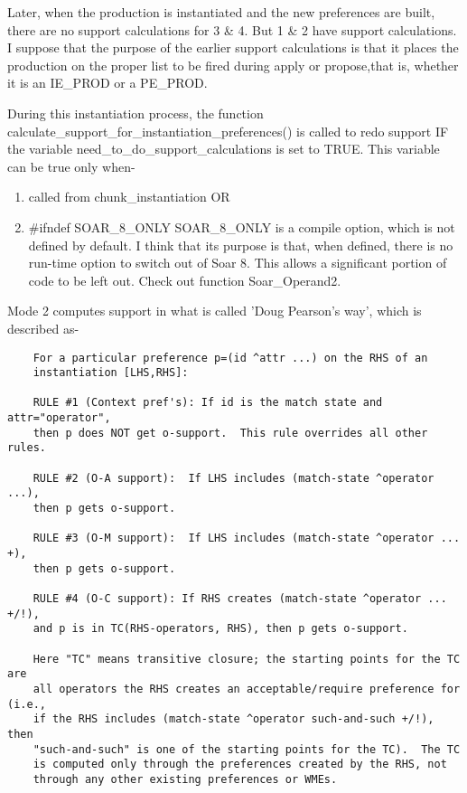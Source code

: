 {	Later, when the production is instantiated and the new preferences are built, there are no support calculations for 3 \& 4. But 1 \& 2 have support calculations. I suppose that the purpose of the earlier support calculations is that it places the production on the proper list to be fired during apply or propose,that is, whether it is an IE\_PROD or a PE\_PROD.

	During this instantiation process, the function calculate\_support\_for\_instantiation\_preferences() is called to redo support IF the variable need\_to\_do\_support\_calculations is set to TRUE. This variable can be true only when-

	\begin{enumerate}
		\item  called from chunk\_instantiation OR
		\item  \#ifndef SOAR\_8\_ONLY
		SOAR\_8\_ONLY is a compile option, which is not defined by default. I think that its purpose is that, when defined, there is no run-time option to switch out of Soar 8. This allows a significant portion of code to be left out. Check out function Soar\_Operand2.
	\end{enumerate}


	Mode 2 computes support in what is called 'Doug Pearson's way', which is described as-

	\begin{verbatim}
	For a particular preference p=(id ^attr ...) on the RHS of an
	instantiation [LHS,RHS]:

	RULE #1 (Context pref's): If id is the match state and attr="operator",
	then p does NOT get o-support.  This rule overrides all other rules.

	RULE #2 (O-A support):  If LHS includes (match-state ^operator ...),
	then p gets o-support.

	RULE #3 (O-M support):  If LHS includes (match-state ^operator ... +),
	then p gets o-support.

	RULE #4 (O-C support): If RHS creates (match-state ^operator ... +/!),
	and p is in TC(RHS-operators, RHS), then p gets o-support.

	Here "TC" means transitive closure; the starting points for the TC are
	all operators the RHS creates an acceptable/require preference for (i.e.,
	if the RHS includes (match-state ^operator such-and-such +/!), then
	"such-and-such" is one of the starting points for the TC).  The TC
	is computed only through the preferences created by the RHS, not
	through any other existing preferences or WMEs.


\end{verbatim}}
